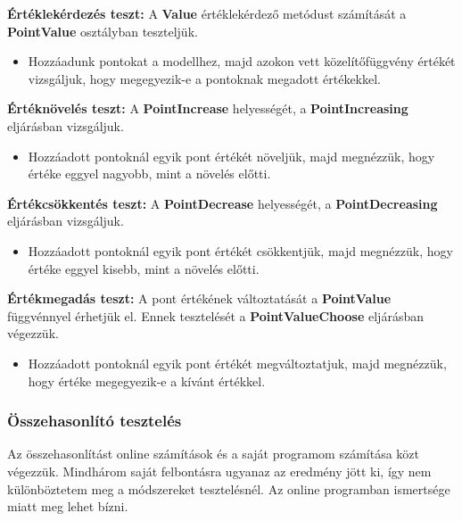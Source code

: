 					\textbf{Értéklekérdezés teszt:} A \textbf{Value} értéklekérdező metódust számítását a \textbf{PointValue} osztályban teszteljük.
					\begin{itemize}
						\item Hozzáadunk pontokat a modellhez, majd azokon vett közelítőfüggvény értékét vizsgáljuk, hogy megegyezik-e a pontoknak megadott értékekkel. 
					\end{itemize} 
				
					\textbf{Értéknövelés teszt:} A \textbf{PointIncrease} helyességét, a \textbf{PointIncreasing} eljárásban vizsgáljuk.
					\begin{itemize}
						\item Hozzáadott pontoknál egyik pont értékét növeljük, majd megnézzük, hogy értéke eggyel nagyobb, mint a növelés előtti. 
					\end{itemize} 
				
					\textbf{Értékcsökkentés teszt:} A \textbf{PointDecrease} helyességét, a \textbf{PointDecreasing} eljárásban vizsgáljuk.
					\begin{itemize}
					    \item Hozzáadott pontoknál egyik pont értékét csökkentjük, majd megnézzük, hogy értéke eggyel kisebb, mint a növelés előtti. 
					\end{itemize} 
				
					\textbf{Értékmegadás teszt:} A pont értékének változtatását a \textbf{PointValue} függvénnyel érhetjük el. Ennek tesztelését a \textbf{PointValueChoose} eljárásban végezzük.
					 \begin{itemize}
					 	\item Hozzáadott pontoknál egyik pont értékét megváltoztatjuk, majd megnézzük, hogy értéke megegyezik-e a kívánt értékkel.
					 \end{itemize} 
			 	
			 	
			 	\subsubsection{Összehasonlító tesztelés}
			 		Az összehasonlítást online számítások és a saját programom számítása közt végezzük. Mindhárom saját felbontásra ugyanaz az eredmény jött ki, így nem különböztetem meg a módszereket tesztelésnél. Az online programban \cite{wolframalpha} ismertsége miatt meg lehet bízni.
			 		
